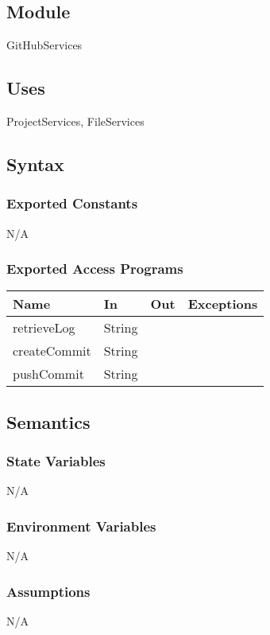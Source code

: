 \documentclass[12pt, titlepage]{article}
\begin{document}
	\subsection{Module}
	GitHubServices
	
	\subsection{Uses}
	ProjectServices, FileServices
	
	\subsection{Syntax}
	
	\subsubsection{Exported Constants}
	N/A
	
	\subsubsection{Exported Access Programs}
	
	\begin{center}
		\begin{tabular}{l l l l}
			\hline
			\textbf{Name} & \textbf{In} & \textbf{Out} & \textbf{Exceptions} \\
			\hline
			retrieveLog & String & ~ & ~ \\
			\hline
			createCommit & String & ~ & ~ \\
			\hline
			pushCommit & String & ~ & ~ \\
			\hline
		\end{tabular}
	\end{center}
	
	\subsection{Semantics}
	
	\subsubsection{State Variables}
	N/A
	
	\subsubsection{Environment Variables}
	N/A
	
	\subsubsection{Assumptions}
	N/A
	
\end{document}

